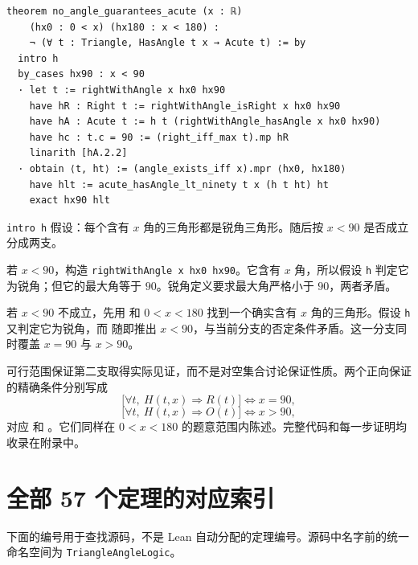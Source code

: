 \documentclass[UTF8,a4paper,zihao=-4,oneside,openany,fontset=fandol]{ctexbook}
\theoremstyle{definition}
\theoremstyle{remark}
\begin{document}
\par\noindent\begin{minipage}{\linewidth}
\begin{Verbatim}[fontsize=\small]
theorem no_angle_guarantees_acute (x : ℝ)
    (hx0 : 0 < x) (hx180 : x < 180) :
    ¬ (∀ t : Triangle, HasAngle t x → Acute t) := by
  intro h
  by_cases hx90 : x < 90
  · let t := rightWithAngle x hx0 hx90
    have hR : Right t := rightWithAngle_isRight x hx0 hx90
    have hA : Acute t := h t (rightWithAngle_hasAngle x hx0 hx90)
    have hc : t.c = 90 := (right_iff_max t).mp hR
    linarith [hA.2.2]
  · obtain ⟨t, ht⟩ := (angle_exists_iff x).mpr ⟨hx0, hx180⟩
    have hlt := acute_hasAngle_lt_ninety t x (h t ht) ht
    exact hx90 hlt
\end{Verbatim}
\end{minipage}\par

\texttt{intro h} 假设：每个含有 $x$ 角的三角形都是锐角三角形。随后按 $x<90$ 是否成立分成两支。

若 $x<90$，构造 \texttt{rightWithAngle x hx0 hx90}。它含有 $x$ 角，所以假设 \texttt{h} 判定它为锐角；但它的最大角等于 $90$。锐角定义要求最大角严格小于 $90$，两者矛盾。

若 $x<90$ 不成立，先用  和 $0<x<180$ 找到一个确实含有 $x$ 角的三角形。假设 \texttt{h} 又判定它为锐角，而  随即推出 $x<90$，与当前分支的否定条件矛盾。这一分支同时覆盖 $x=90$ 与 $x>90$。

可行范围保证第二支取得实际见证，而不是对空集合讨论保证性质。两个正向保证的精确条件分别写成
\[
\bigl[\forall t,\ H(t,x)\Rightarrow R(t)\bigr]
\Longleftrightarrow x=90,
\]
\[
\bigl[\forall t,\ H(t,x)\Rightarrow O(t)\bigr]
\Longleftrightarrow x>90,
\]
对应  和 。它们同样在 $0<x<180$ 的题意范围内陈述。完整代码和每一步证明均收录在附录中。


\section{全部 57 个定理的对应索引}

下面的编号用于查找源码，不是 Lean 自动分配的定理编号。源码中名字前的统一命名空间为 \texttt{TriangleAngleLogic}。
\end{document}
